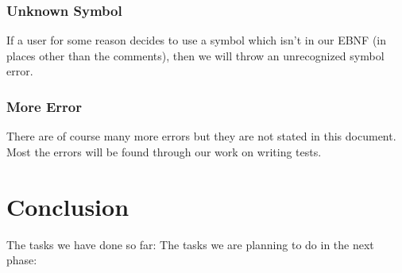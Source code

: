 \documentclass[10pt]{article}
\begin{document}
\subsubsection{Unknown Symbol}

If a user for some reason decides to use a symbol which isn't in our EBNF (in places other than the comments), then we will throw an unrecognized symbol error.

\subsubsection{More Error}

There are of course many more errors but they are not stated in this document. Most the errors will be found through our work on writing tests.

\section{Conclusion}
The tasks we have done so far:
The tasks we are planning to do in the next phase:
\end{document}
